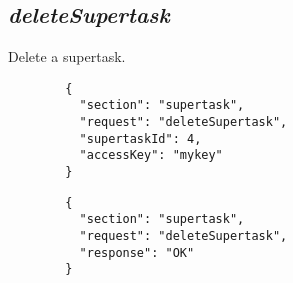 \subsection*{\textit{deleteSupertask}}
	Delete a supertask.
	{
		\color{blue}
		\begin{verbatim}
		{
		  "section": "supertask",
		  "request": "deleteSupertask",
		  "supertaskId": 4,
		  "accessKey": "mykey"
		}
		\end{verbatim}
	}
	{
		\color{OliveGreen}
		\begin{verbatim}
		{
		  "section": "supertask",
		  "request": "deleteSupertask",
		  "response": "OK"
		}
		\end{verbatim}
	}





